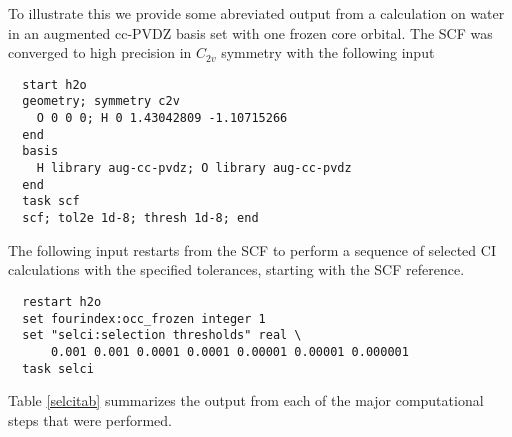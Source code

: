 To illustrate this we provide some abreviated output from a
calculation on water in an augmented cc-PVDZ basis set with one frozen
core orbital.  The SCF was converged to high precision in $C_{2v}$
symmetry with the following input
\begin{verbatim}
  start h2o
  geometry; symmetry c2v
    O 0 0 0; H 0 1.43042809 -1.10715266
  end
  basis
    H library aug-cc-pvdz; O library aug-cc-pvdz
  end
  task scf
  scf; tol2e 1d-8; thresh 1d-8; end
\end{verbatim}

The following input restarts from the SCF to perform a sequence of
selected CI calculations with the specified tolerances, starting with
the SCF reference.
\begin{verbatim}
  restart h2o
  set fourindex:occ_frozen integer 1
  set "selci:selection thresholds" real \
      0.001 0.001 0.0001 0.0001 0.00001 0.00001 0.000001
  task selci
\end{verbatim}
Table \ref{selcitab} summarizes the output from each of the major
computational steps that were performed.
